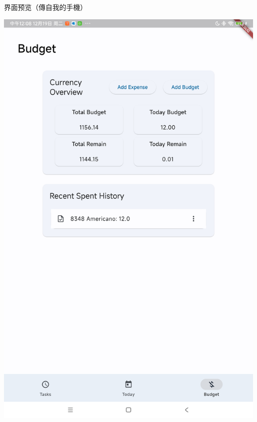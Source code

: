 \documentclass{beamer}
\begin{document}
\begin{frame}{界面预览（傳自我的手機）}
\begin{center}
\begin{minipage}[r]{.45\textwidth}
                \includegraphics[width=.85\textwidth]{page-budget.jpg}
            \end{minipage}
        \end{center}
    \end{frame}
\end{document}
